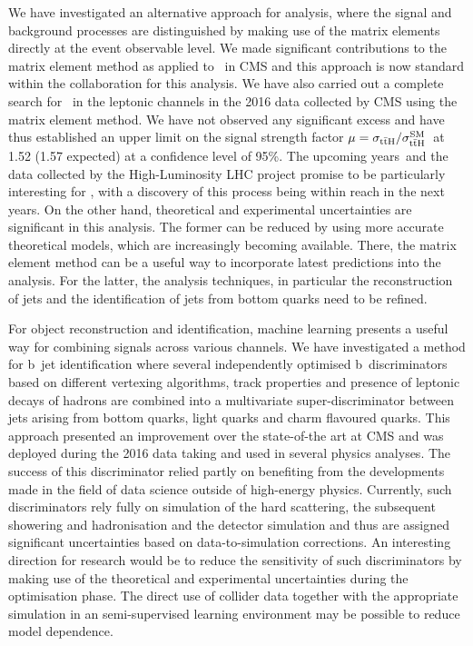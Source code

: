 We have investigated an alternative approach for analysis, where the signal and background processes are distinguished by making use of the matrix elements directly at the event observable level. We made significant contributions to the matrix element method as applied to \ttHbb~in CMS and this approach is now standard within the collaboration for this analysis. We have also carried out a complete search for \ttHbb~in the leptonic channels in the 2016 data collected by CMS using the matrix element method. We have not observed any significant excess and have thus established an upper limit on the signal strength factor $\mu = \sigma_{\mathrm{t} \bar{\mathrm{t}} \mathrm{H}}/\sigma_{\mathrm{t} \bar{\mathrm{t}} \mathrm{H}}^{\mathrm{SM}}$~at 1.52 (1.57 expected) at a confidence level of 95\%. The upcoming years and the data collected by the High-Luminosity LHC project promise to be particularly interesting for \ttH, with a discovery of this process being within reach in the next years. On the other hand, theoretical and experimental uncertainties are significant in this analysis. The former can be reduced by using more accurate theoretical models, which are increasingly becoming available. There, the matrix element method can be a useful way to incorporate latest predictions into the analysis. For the latter, the analysis techniques, in particular the reconstruction of jets and the identification of jets from bottom quarks need to be refined.

For object reconstruction and identification, machine learning presents a useful way for combining signals across various channels. We have investigated a method for b~jet identification where several independently optimised b~discriminators based on different vertexing algorithms, track properties and presence of leptonic decays of hadrons are combined into a multivariate super-discriminator between jets arising from bottom quarks, light quarks and charm flavoured quarks. This approach presented an improvement over the state-of-the art at CMS and was deployed during the 2016 data taking and used in several physics analyses. The success of this discriminator relied partly on benefiting from the developments made in the field of data science outside of high-energy physics. Currently, such discriminators rely fully on simulation of the hard scattering, the subsequent showering and hadronisation and the detector simulation and thus are assigned significant uncertainties based on data-to-simulation corrections. An interesting direction for research would be to reduce the sensitivity of such discriminators by making use of the theoretical and experimental uncertainties during the optimisation phase. The direct use of collider data together with the appropriate simulation in an semi-supervised learning environment may be possible to reduce model dependence.


